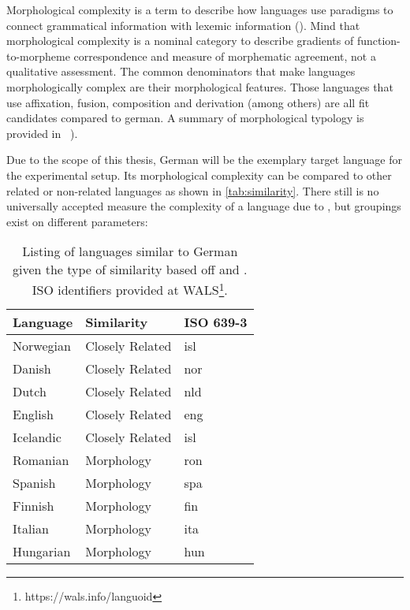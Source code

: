 Morphological complexity is a term to describe how languages use paradigms to connect grammatical information with lexemic information (\cite{MORPHOLOGICALCOMPLEXITY}).
Mind that morphological complexity is a nominal category to describe gradients of function-to-morpheme correspondence and measure of morphematic agreement, not a qualitative assessment.
The common denominators that make languages morphologically complex are their morphological features.
Those languages that use affixation, fusion, composition and derivation (among others) are all fit candidates compared to german.
A summary of morphological typology is provided in ~\cite*[78--93]{LINGUISTICTYPOLOGY}).

Due to the scope of this thesis, German will be the exemplary target language for the experimental setup.
Its morphological complexity can be compared to other related or non-related languages as shown in \autoref{tab:similarity}.
There still is no universally accepted measure the complexity of a language due to , but groupings exist on different parameters:
\\
\begin{table}[h]
    \centering
    \begin{tabular}{lll}
        \toprule
        \textbf{Language} & \textbf{Similarity} & \textbf{ISO 639-3} \\
        \midrule
        Norwegian & Closely Related & isl \\
        Danish & Closely Related & nor \\
        Dutch & Closely Related & nld \\
        English & Closely Related & eng \\
        Icelandic & Closely Related & isl \\
        Romanian & Morphology & ron \\
        Spanish & Morphology & spa \\
        Finnish & Morphology & fin \\
        Italian & Morphology & ita \\
        Hungarian & Morphology & hun \\
        \bottomrule
    \end{tabular}
    \caption{Listing of languages similar to German given the type of similarity based off \textcite{lehmann} and \textcite{MORPHOSYNTAXCOMPLEXITY1}. ISO identifiers provided at WALS\footnote{https://wals.info/languoid}.}
    \label{tab:similarity}
\end{table}

